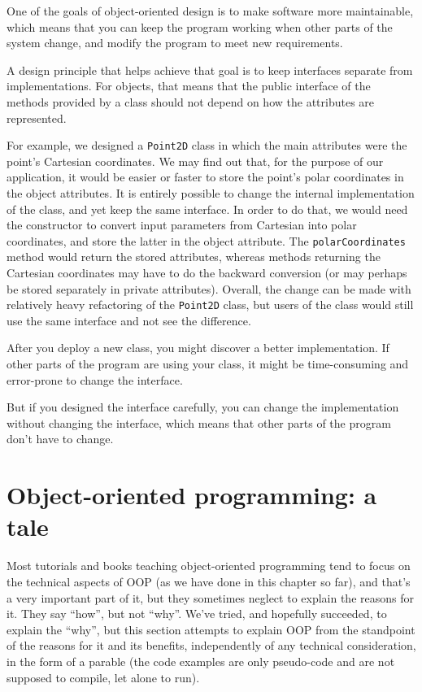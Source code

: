 One of the goals of object-oriented design is to make software more
maintainable, which means that you can keep the program working when
other parts of the system change, and modify the program to meet new
requirements.

A design principle that helps achieve that goal is to keep
interfaces separate from implementations.  For objects, that means
that the public interface of the methods provided by a class 
should not depend on how the attributes are represented.

For example, we designed a {\tt Point2D} class in which the main 
attributes were the point's Cartesian coordinates. We may find 
out that, for the purpose of our application, it would be easier 
or faster to store the point's polar coordinates in the object 
attributes. It is entirely possible to change the internal 
implementation of the class, and yet keep the same interface. 
In order to do that, we would need the constructor 
to convert input parameters from 
Cartesian into polar coordinates, and store the latter in the 
object attribute. The {\tt polarCoordinates} method would 
return the stored attributes, whereas methods returning the 
Cartesian coordinates may have to do the backward conversion 
(or may perhaps be stored separately in private attributes). 
Overall, the change can be made with relatively heavy refactoring 
of the {\tt Point2D} class, but users of the class would still 
use the same interface and not see the difference.

After you deploy a new class, you might discover a better
implementation.  If other parts of the program are using your
class, it might be time-consuming and error-prone to change the
interface.  

But if you designed the interface carefully, you can
change the implementation without changing the interface, which
means that other parts of the program don't have to change.


\section{Object-oriented programming: a tale}

Most tutorials and books teaching object-oriented 
programming tend to focus on the technical aspects 
of OOP (as we have done in this chapter so far), and 
that's a very important part of it, but they sometimes 
neglect to explain the reasons for it. They say ``how'', 
but not ``why''. We've tried, and hopefully succeeded, to 
explain the ``why'', but this section attempts to 
explain OOP from the standpoint of the reasons for it 
and its benefits, independently of any technical 
consideration, in the form of a parable (the code 
examples are only pseudo-code and are not supposed 
to compile, let alone to run). 

